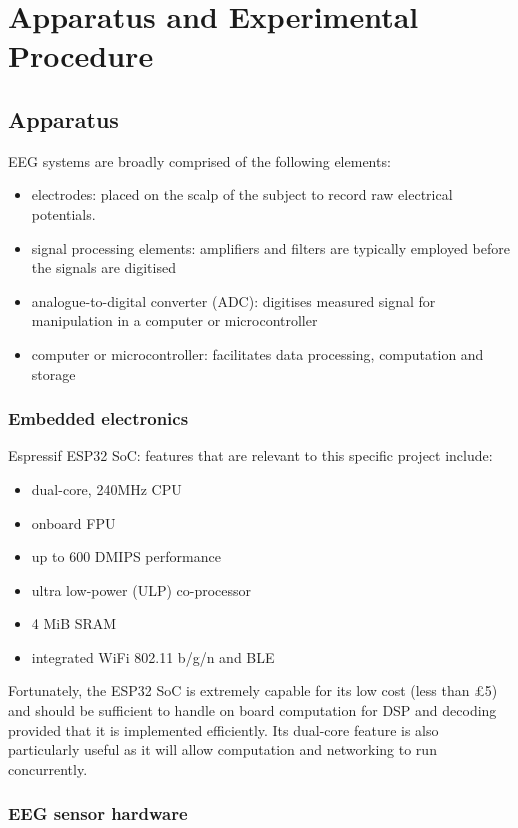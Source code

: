 \chapter{Apparatus and Experimental Procedure}
\label{chapter:experimental-procedure}

\graphicspath{ {report/Chapter4/assets/} } 

\section{Apparatus}

EEG systems are broadly comprised of the following elements:
\begin{itemize}
    \item electrodes: placed on the scalp of the subject to record raw electrical potentials. 
    \item signal processing elements: amplifiers and filters are typically employed before the signals are digitised
    \item analogue-to-digital converter (ADC): digitises measured signal for manipulation in a computer or microcontroller
    \item computer or microcontroller: facilitates data processing, computation and storage
\end{itemize}

\subsection{Embedded electronics}
Espressif ESP32 SoC: features that are relevant to this specific project include: 
\begin{itemize}
    \item dual-core, 240MHz CPU
    \item onboard FPU
    \item up to 600 DMIPS performance
    \item ultra low-power (ULP) co-processor
    \item 4 MiB SRAM
    \item integrated WiFi 802.11 b/g/n and BLE
\end{itemize}
Fortunately, the ESP32 SoC is extremely capable for its low cost (less than £5) and should be sufficient to handle on board computation for DSP and decoding provided that it is implemented efficiently. Its dual-core feature is also particularly useful as it will allow computation and networking to run concurrently. 
\subsection{EEG sensor hardware}

